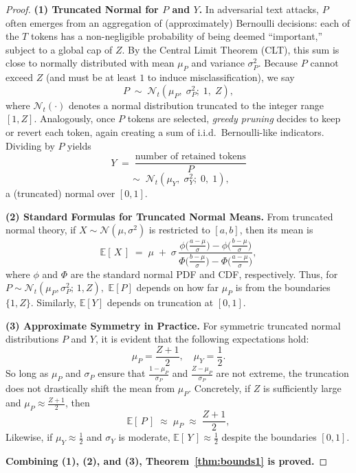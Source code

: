 \begin{proof}
\textbf{(1) Truncated Normal for \(P\) and \(Y\).}  
In adversarial text attacks, \(P\) often emerges from an aggregation of (approximately) Bernoulli decisions: each of the \(T\) tokens has a non-negligible probability of being deemed “important,” subject to a global cap of \(Z\). By the Central Limit Theorem (CLT), this sum is close to normally distributed with mean \(\mu_P\) and variance \(\sigma_P^2\). Because \(P\) cannot exceed \(Z\) (and must be at least \(1\) to induce misclassification), we say
\[
  P \;\sim\; \mathcal{N}_t(\mu_P,\;\sigma_P^2;\;1,\;Z),
\]
where \(\mathcal{N}_t(\cdot)\) denotes a normal distribution truncated to the integer range \([1,Z]\). Analogously, once \(P\) tokens are selected, \emph{greedy pruning} decides to keep or revert each token, again creating a sum of i.i.d.\ Bernoulli-like indicators. Dividing by \(P\) yields
\[
  Y 
  \;=\; \frac{\text{number of retained tokens}}{P}
\]
\[
  \;\sim\; \mathcal{N}_t(\mu_Y,\;\sigma_Y^2;\;0,\;1),
\]
a (truncated) normal over \([0,1]\).

\noindent
\textbf{(2) Standard Formulas for Truncated Normal Means.}  
From truncated normal theory, if \(X\sim \mathcal{N}(\mu,\sigma^2)\) is restricted to \([a,b]\), then its mean is
\[
  \mathbb{E}[\,X\,]
  \;=\;
  \mu 
  \;+\;
  \sigma\,\frac{\phi\!\bigl(\tfrac{a-\mu}{\sigma}\bigr) - \phi\!\bigl(\tfrac{b-\mu}{\sigma}\bigr)}
                     {\Phi\!\bigl(\tfrac{b-\mu}{\sigma}\bigr) - \Phi\!\bigl(\tfrac{a-\mu}{\sigma}\bigr)},
\]
where \(\phi\) and \(\Phi\) are the standard normal PDF and CDF, respectively. Thus, for
\(
  P \sim \mathcal{N}_t(\mu_P,\sigma_P^2;\,1,Z),
\)
\(\mathbb{E}[P]\) depends on how far \(\mu_P\) is from the boundaries \(\{1,Z\}\). Similarly, \(\mathbb{E}[Y]\) depends on truncation at \([0,1]\).

\noindent
\textbf{(3) Approximate Symmetry in Practice.}  
For symmetric truncated normal distributions \( P \) and \( Y \), it is evident that the following expectations hold:  
\[
\mu_P = \frac{Z+1}{2}, \quad \mu_Y = \frac{1}{2}.
\]
So long as \(\mu_P\) and \(\sigma_P\) ensure that \(\frac{1-\mu_P}{\sigma_P}\) and \(\frac{Z-\mu_P}{\sigma_P}\) are not extreme, the truncation does not drastically shift the mean from \(\mu_P\). Concretely, if \(Z\) is sufficiently large and \(\mu_P\approx \tfrac{Z+1}{2}\), then
\[
  \mathbb{E}[\,P\,]
  \;\approx\;
  \mu_P
  \;\approx\;
  \frac{Z+1}{2},
\]
Likewise, if \(\mu_Y \approx \tfrac12\) and \(\sigma_Y\) is moderate, \(\mathbb{E}[\,Y\,]\approx \tfrac{1}{2}\) despite the boundaries \([0,1]\).

\noindent \textbf{Combining (1), (2), and (3), Theorem~\ref{thm:bounds1} is proved.}
\end{proof}

